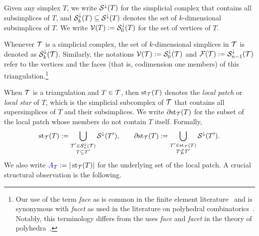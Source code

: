 \documentclass[10pt,letterpaper]{article}
\newcommand{\mwl}[1]{{\color{red}#1}}
\begin{document}
Given any simplex $T$, we write ${\mathcal S}^{\downarrow}(T)$ for the simplicial complex that contains all subsimplices of $T$,
and ${\mathcal S}^{\downarrow}_{{k}}(T) \subseteq {\mathcal S}^{\downarrow}(T)$ denotes the set of $k$-dimensional subsimplices of $T$. 
We write ${\mathcal V}(T) := {\mathcal S}^{\downarrow}_{0}(T)$ for the set of vertices of $T$.

Whenever ${\mathcal T}$ is a simplicial complex, 
the set of $k$-dimensional simplices in ${\mathcal T}$ is denoted as ${\mathcal S}^{\downarrow}_{{k}}({\mathcal T})$. 
Similarly, the notations ${\mathcal V}({\mathcal T}) := {\mathcal S}^{\downarrow}_{0}({\mathcal T})$ and ${\mathcal F}({\mathcal T}) := {\mathcal S}^{\downarrow}_{n-1}({\mathcal T})$ refer to the vertices and the faces (that is, codimension one members) of this triangulation.\footnote{
    Our use of the term \textit{face} as is common in the finite element literature~\cite{brenner2008mathematical}
    and is synonymous with \textit{facet} as used in the literature on polyhedral combinatorics~\cite{schrijver1998theory}.
    Notably, this terminology differs from the uses \textit{face} and \textit{facet} in the theory of polyhedra~\cite{ziegler1995lectures}.
}

When ${\mathcal T}$ is a triangulation and $T \in {\mathcal T}$, then $\operatorname{st}_{{\mathcal T}}(T)$ denotes the \emph{local patch} or \textit{local star} of $T$, 
which is the simplicial subcomplex of ${\mathcal T}$ that contains all supersimplices of $T$ and their subsimplices. 
We write ${\partial \rm st}_{{\mathcal T}}(T)$ for the subset of the local patch whose members do not contain $T$ itself. 
Formally,
\begin{gather*}
    \operatorname{st}_{{\mathcal T}}(T) := \bigcup_{ \substack{ T' \in {\mathcal S}^{\downarrow}_{n}({\mathcal T}) \\ T \subseteq T' } } {\mathcal S}^{\downarrow}(T'),
    \qquad 
    {\partial \rm st}_{{\mathcal T}}(T) := \bigcup_{ \substack{ T' \in \operatorname{st}_{{\mathcal T}}(T) \\ T \nsubseteq T' } } {\mathcal S}^{\downarrow}(T').
\end{gather*}
We also write ${\color{blue}A}_T := | \operatorname{st}_{{\mathcal T}}(T) |$ for the underlying set of the local patch. 
A crucial structural observation is the following.
\end{document}
